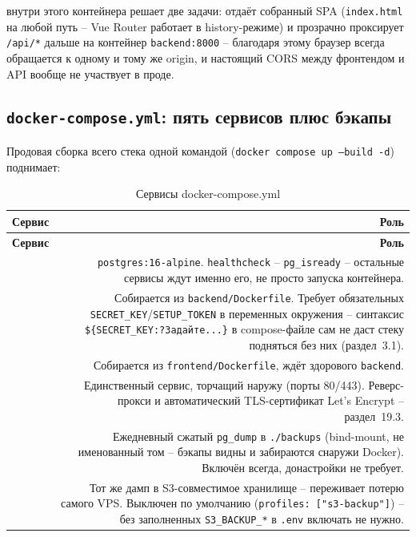  внутри этого контейнера решает две задачи:
отдаёт собранный SPA (\texttt{index.html} на любой путь -- Vue Router
работает в history-режиме) и прозрачно проксирует \texttt{/api/*}
дальше на контейнер \texttt{backend:8000} -- благодаря этому браузер
всегда обращается к одному и тому же origin, и настоящий CORS между
фронтендом и API вообще не участвует в проде.

\subsection{\texttt{docker-compose.yml}: пять сервисов плюс бэкапы}

Продовая сборка всего стека одной командой
(\texttt{docker compose up --build -d}) поднимает:

\begin{xltabular}{\textwidth}{M D}
\caption{Сервисы docker-compose.yml} \\
\hline
\textbf{Сервис} & \textbf{Роль} \\
\hline
\endfirsthead
\hline
\textbf{Сервис} & \textbf{Роль} \\
\hline
\endhead
\hline
\endfoot
{} & \texttt{postgres:16-alpine}. \texttt{healthcheck} --
  \texttt{pg_isready} -- остальные сервисы ждут именно его, не просто
  запуска контейнера. \\
 & Собирается из \texttt{backend/Dockerfile}. Требует
  обязательных \texttt{SECRET_KEY}/\texttt{SETUP_TOKEN} в переменных
  окружения -- синтаксис \texttt{\$\{SECRET_KEY:?Задайте...\}} в
  compose-файле сам не даст стеку подняться без них (раздел~3.1). \\
 & Собирается из \texttt{frontend/Dockerfile}, ждёт
  здорового \texttt{backend}. \\
 & Единственный сервис, торчащий наружу (порты 80/443).
  Реверс-прокси и автоматический TLS-сертификат Let's Encrypt -- раздел~19.3. \\
 & Ежедневный сжатый \texttt{pg_dump} в
  \texttt{./backups} (bind-mount, не именованный том -- бэкапы видны и
  забираются снаружи Docker). Включён всегда, донастройки не требует. \\
 & Тот же дамп в S3-совместимое хранилище --
  переживает потерю самого VPS. Выключен по умолчанию
  (\texttt{profiles: ["s3-backup"]}) -- без заполненных
  \texttt{S3_BACKUP_*} в \texttt{.env} включать не нужно. \\
\end{xltabular}


